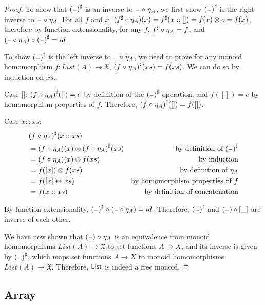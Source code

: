 \begin{proof}
    To show that ${({\scriptstyle{-}})}^{\sharp}$ is an inverse to ${\scriptstyle{-}} \mathrel{\circ} \eta_A$,
    we first show ${({\scriptstyle{-}})}^{\sharp}$ is the right inverse to ${\scriptstyle{-}} \mathrel{\circ} \eta_A$.
    For all $f$ and $x$, $({f}^{\sharp} \circ \eta_A)(x) = {f}^{\sharp}(x :: []) = f(x) \otimes e = f(x)$,
    therefore by function extensionality, for any $f$, ${f}^{\sharp} \circ \eta_A = f$,
    and $({\scriptstyle{-}} \circ \eta_A) \mathrel{\circ} {({\scriptstyle{-}})}^{\sharp} = id$.
    
    To show ${({\scriptstyle{-}})}^{\sharp}$ is the left inverse to ${\scriptstyle{-}} \mathrel{\circ} \eta_A$, we need to prove
    for any monoid homomorphism $f : List(A) \to \mathfrak{X}$, ${(f \mathrel{\circ} \eta_A)}^{\sharp}(xs) = f(xs)$.
    We can do so by induction on $xs$.

    Case []: ${(f \mathrel{\circ} \eta_A)}^{\sharp}([]) = e$ by definition of the ${({\scriptstyle{-}})}^{\sharp}$ operation,
    and $f([]) = e$ by homomorphism properties of $f$. Therefore, ${(f \mathrel{\circ} \eta_A)}^{\sharp}([]) = f([])$.

    Case $x :: xs$: 
    \begin{align*}
        & {(f \mathrel{\circ} \eta_A)}^{\sharp}(x :: xs) \\
        & = (f \mathrel{\circ} \eta_A)(x) \otimes {(f \mathrel{\circ}\eta_A)}^{\sharp}(xs) & \text{by definition of ${({\scriptstyle{-}})}^{\sharp}$} \\
        & = (f \mathrel{\circ} \eta_A)(x) \otimes f(xs) & \text{by induction} \\
        & = f([x]) \otimes f(xs) & \text{by definition of $\eta_A$} \\
        & = f([x] \mathbin{\text{\ttfamily\upshape ++}} xs) & \text{by homomorphism properties of $f$} \\
        & = f(x :: xs) & \text{by definition of concatenation}
    \end{align*}

    By function extensionality, ${({\scriptstyle{-}})}^{\sharp} \mathrel{\circ} ({\scriptstyle{-}} \circ \eta_A) = id$.
    Therefore, ${({\scriptstyle{-}})}^{\sharp}$ and $({\scriptstyle{-}}) \circ [\_]$ are inverse of each other.

    We have now shown that $({\scriptstyle{-}}) \mathrel{\circ} \eta_A$ is an equivalence from monoid homomorphisms $List(A) \to \mathfrak{X}$
    to set functions $A \to X$, and its inverse is given by ${({\scriptstyle{-}})}^{\sharp}$, which maps set
    functions $A \to X$ to monoid homomorphisms $List(A) \to \mathfrak{X}$. Therefore, $\operatorname{\mathsf{List}}$ is indeed
    a free monoid.
    
\end{proof}
\subsection{Array}

